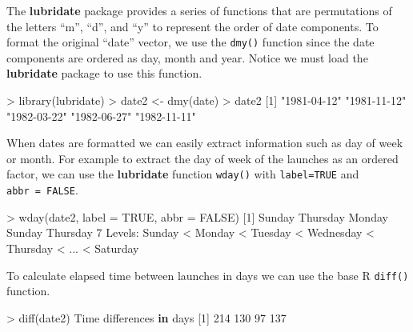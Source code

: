 \documentclass[
]{book}
\newenvironment{Shaded}{\begin{snugshade}}{\end{snugshade}}
\newcommand{\AttributeTok}[1]{\textcolor[rgb]{0.77,0.63,0.00}{#1}}
\newcommand{\ConstantTok}[1]{\textcolor[rgb]{0.00,0.00,0.00}{#1}}
\newcommand{\ControlFlowTok}[1]{\textcolor[rgb]{0.13,0.29,0.53}{\textbf{#1}}}
\newcommand{\DecValTok}[1]{\textcolor[rgb]{0.00,0.00,0.81}{#1}}
\newcommand{\FunctionTok}[1]{\textcolor[rgb]{0.00,0.00,0.00}{#1}}
\newcommand{\NormalTok}[1]{#1}
\newcommand{\OtherTok}[1]{\textcolor[rgb]{0.56,0.35,0.01}{#1}}
\newcommand{\SpecialCharTok}[1]{\textcolor[rgb]{0.00,0.00,0.00}{#1}}
\newcommand{\StringTok}[1]{\textcolor[rgb]{0.31,0.60,0.02}{#1}}
\begin{document}
The \textbf{lubridate} package provides a series of functions that are permutations of the letters ``m'', ``d'', and ``y'' to represent the order of date components. To format the original ``date'' vector, we use the \texttt{dmy()} function since the date components are ordered as day, month and year. Notice we must load the \textbf{lubridate} package to use this function.

\begin{Shaded}
\begin{Highlighting}[]
\SpecialCharTok{\textgreater{}} \FunctionTok{library}\NormalTok{(lubridate)}
\SpecialCharTok{\textgreater{}}\NormalTok{ date2 }\OtherTok{\textless{}{-}} \FunctionTok{dmy}\NormalTok{(date)}
\SpecialCharTok{\textgreater{}}\NormalTok{ date2}
\NormalTok{[}\DecValTok{1}\NormalTok{] }\StringTok{"1981{-}04{-}12"} \StringTok{"1981{-}11{-}12"} \StringTok{"1982{-}03{-}22"} \StringTok{"1982{-}06{-}27"} \StringTok{"1982{-}11{-}11"}
\end{Highlighting}
\end{Shaded}

When dates are formatted we can easily extract information such as day of week or month. For example to extract the day of week of the launches as an ordered factor, we can use the \textbf{lubridate} function \texttt{wday()} with \texttt{label=TRUE} and \texttt{abbr\ =\ FALSE}.

\begin{Shaded}
\begin{Highlighting}[]
\SpecialCharTok{\textgreater{}} \FunctionTok{wday}\NormalTok{(date2, }\AttributeTok{label =} \ConstantTok{TRUE}\NormalTok{, }\AttributeTok{abbr =} \ConstantTok{FALSE}\NormalTok{)}
\NormalTok{[}\DecValTok{1}\NormalTok{] Sunday   Thursday Monday   Sunday   Thursday}
\DecValTok{7}\NormalTok{ Levels}\SpecialCharTok{:}\NormalTok{ Sunday }\SpecialCharTok{\textless{}}\NormalTok{ Monday }\SpecialCharTok{\textless{}}\NormalTok{ Tuesday }\SpecialCharTok{\textless{}}\NormalTok{ Wednesday }\SpecialCharTok{\textless{}}\NormalTok{ Thursday }\SpecialCharTok{\textless{}}\NormalTok{ ... }\SpecialCharTok{\textless{}}\NormalTok{ Saturday}
\end{Highlighting}
\end{Shaded}

To calculate elapsed time between launches in days we can use the base R \texttt{diff()} function.

\begin{Shaded}
\begin{Highlighting}[]
\SpecialCharTok{\textgreater{}} \FunctionTok{diff}\NormalTok{(date2)}
\NormalTok{Time differences }\ControlFlowTok{in}\NormalTok{ days}
\NormalTok{[}\DecValTok{1}\NormalTok{] }\DecValTok{214} \DecValTok{130}  \DecValTok{97} \DecValTok{137}
\end{Highlighting}
\end{Shaded}
\end{document}
